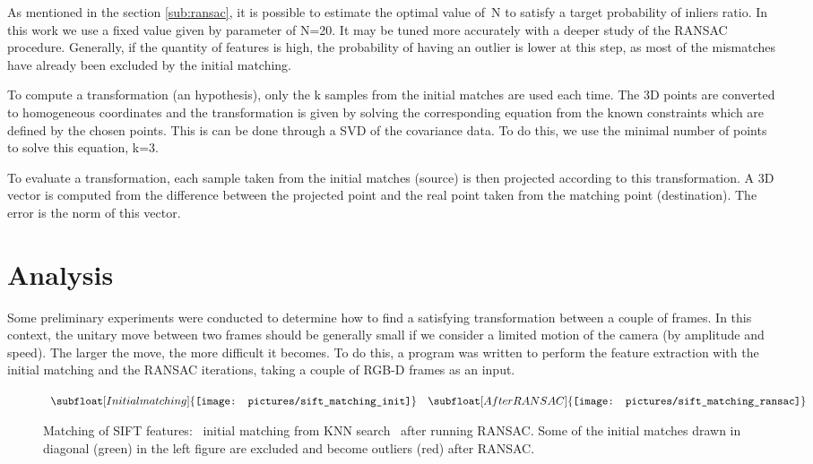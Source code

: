 As mentioned in the section \ref{sub:ransac}, it is possible to estimate the optimal value of~N to satisfy a target probability of inliers ratio. In this work we use a fixed value given by parameter of N=20. It may be tuned more accurately with a deeper study of the \gls{RANSAC} procedure. Generally, if the quantity of features is high, the probability of having an outlier is lower at this step, as most of the mismatches have already been excluded by the initial matching.


To compute a transformation (an hypothesis), only the k samples from the initial matches are used each time. The 3D points are converted to homogeneous coordinates and the transformation is given by solving the corresponding equation from the known constraints which are defined by the chosen points. This is can be done through a \gls{SVD} of the covariance data. To do this, we use the minimal number of points to solve this equation, k=3.

To evaluate a transformation, each sample taken from the initial matches (source) is then projected according to this transformation. A 3D vector is computed from the difference between the projected point and the real point taken from the matching point (destination). The error is the norm of this vector.

\section{Analysis}

Some preliminary experiments were conducted to determine how to find a satisfying transformation between a couple of frames. In this context, the unitary move between two frames should be generally small if we consider a limited motion of the camera (by amplitude and speed). The larger the move, the more difficult it becomes. To do this, a program was written to perform the feature extraction with the initial matching and the RANSAC iterations, taking a couple of RGB-D frames as an input.

\begin{figure}[H]
\centering$
 \begin{array}{cc}
 \subfloat[Initial matching]{\label{fig:sift_match_1} \texttt{[image: pictures/sift\_matching\_init]}} &
 \subfloat[After RANSAC]{\label{fig:sift_match_2} \texttt{[image: pictures/sift\_matching\_ransac]}}
 \end{array}$
\caption{Matching of SIFT features: \protect{}~initial matching from KNN search \protect{}~after running RANSAC. Some of the initial matches drawn in diagonal (green) in the left figure are excluded and become outliers (red) after RANSAC.}
\end{figure}

